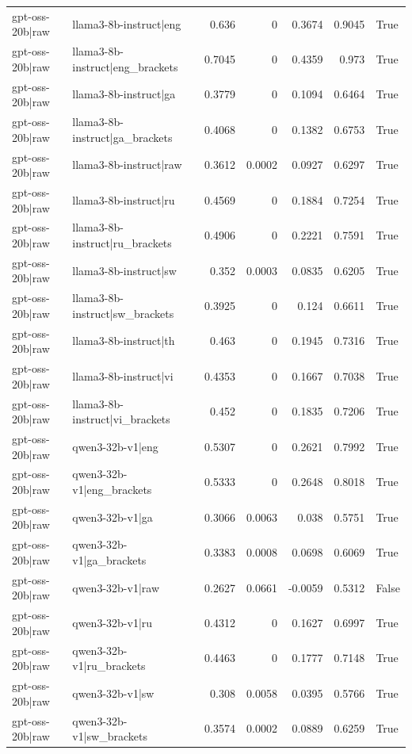 \begin{table}
\begin{tabular}{l l r r r r l}
gpt-oss-20b|raw & llama3-8b-instruct|eng & 0.636 & 0 & 0.3674 & 0.9045 & True \\
gpt-oss-20b|raw & llama3-8b-instruct|eng_brackets & 0.7045 & 0 & 0.4359 & 0.973 & True \\
gpt-oss-20b|raw & llama3-8b-instruct|ga & 0.3779 & 0 & 0.1094 & 0.6464 & True \\
gpt-oss-20b|raw & llama3-8b-instruct|ga_brackets & 0.4068 & 0 & 0.1382 & 0.6753 & True \\
gpt-oss-20b|raw & llama3-8b-instruct|raw & 0.3612 & 0.0002 & 0.0927 & 0.6297 & True \\
gpt-oss-20b|raw & llama3-8b-instruct|ru & 0.4569 & 0 & 0.1884 & 0.7254 & True \\
gpt-oss-20b|raw & llama3-8b-instruct|ru_brackets & 0.4906 & 0 & 0.2221 & 0.7591 & True \\
gpt-oss-20b|raw & llama3-8b-instruct|sw & 0.352 & 0.0003 & 0.0835 & 0.6205 & True \\
gpt-oss-20b|raw & llama3-8b-instruct|sw_brackets & 0.3925 & 0 & 0.124 & 0.6611 & True \\
gpt-oss-20b|raw & llama3-8b-instruct|th & 0.463 & 0 & 0.1945 & 0.7316 & True \\
gpt-oss-20b|raw & llama3-8b-instruct|vi & 0.4353 & 0 & 0.1667 & 0.7038 & True \\
gpt-oss-20b|raw & llama3-8b-instruct|vi_brackets & 0.452 & 0 & 0.1835 & 0.7206 & True \\
gpt-oss-20b|raw & qwen3-32b-v1|eng & 0.5307 & 0 & 0.2621 & 0.7992 & True \\
gpt-oss-20b|raw & qwen3-32b-v1|eng_brackets & 0.5333 & 0 & 0.2648 & 0.8018 & True \\
gpt-oss-20b|raw & qwen3-32b-v1|ga & 0.3066 & 0.0063 & 0.038 & 0.5751 & True \\
gpt-oss-20b|raw & qwen3-32b-v1|ga_brackets & 0.3383 & 0.0008 & 0.0698 & 0.6069 & True \\
gpt-oss-20b|raw & qwen3-32b-v1|raw & 0.2627 & 0.0661 & -0.0059 & 0.5312 & False \\
gpt-oss-20b|raw & qwen3-32b-v1|ru & 0.4312 & 0 & 0.1627 & 0.6997 & True \\
gpt-oss-20b|raw & qwen3-32b-v1|ru_brackets & 0.4463 & 0 & 0.1777 & 0.7148 & True \\
gpt-oss-20b|raw & qwen3-32b-v1|sw & 0.308 & 0.0058 & 0.0395 & 0.5766 & True \\
gpt-oss-20b|raw & qwen3-32b-v1|sw_brackets & 0.3574 & 0.0002 & 0.0889 & 0.6259 & True \\

\end{tabular}
\end{table}
